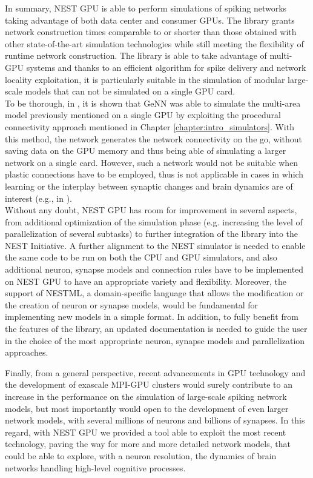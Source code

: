 \documentclass[a4paper, 12pt, twoside, openright]{book}
\begin{document}
In summary, NEST GPU is able to perform simulations of spiking networks taking advantage of both data center and consumer GPUs. The library grants network construction times comparable to or shorter than those obtained with other state-of-the-art simulation technologies while still meeting the flexibility of runtime network construction. The library is able to take advantage of multi-GPU systems and thanks to an efficient algorithm for spike delivery and network locality exploitation, it is particularly suitable in the simulation of modular large-scale models that can not be simulated on a single GPU card.\\
To be thorough, in \cite{Knight2021b}, it is shown that GeNN was able to simulate the multi-area model previously mentioned on a single GPU by exploiting the procedural connectivity approach mentioned in Chapter \ref{chapter:intro_simulators}. With this method, the network generates the network connectivity on the go, without saving data on the GPU memory and thus being able of simulating a larger network on a single card. However, such a network would not be suitable when plastic connections have to be employed, thus is not applicable in cases in which learning or the interplay between synaptic changes and brain dynamics are of interest (e.g., in \cite{Capone2019,Golosio2021-ThaCo,DeLuca2023}).\\


Without any doubt, NEST GPU has room for improvement in several aspects, from additional optimization of the simulation phase (e.g. increasing the level of parallelization of several subtasks) to further integration of the library into the NEST Initiative. A further alignment to the NEST simulator is needed to enable the same code to be run on both the CPU and GPU simulators, and also additional neuron, synapse models and connection rules have to be implemented on NEST GPU to have an appropriate variety and flexibility. Moreover, the support of NESTML, a domain-specific language that allows the modification or the creation of neuron or synapse models, would be fundamental for implementing new models in a simple format. In addition, to fully benefit from the features of the library, an updated documentation is needed to guide the user in the choice of the most appropriate neuron, synapse models and parallelization approaches.


Finally, from a general perspective, recent advancements in GPU technology and the development of exascale MPI-GPU clusters would surely contribute to an increase in the performance on the simulation of large-scale spiking network models, but most importantly would open to the development of even larger network models, with several millions of neurons and billions of synapses. In this regard, with NEST GPU we provided a tool able to exploit the most recent technology, paving the way for more and more detailed network models, that could be able to explore, with a neuron resolution, the dynamics of brain networks handling high-level cognitive processes. 
\end{document}
